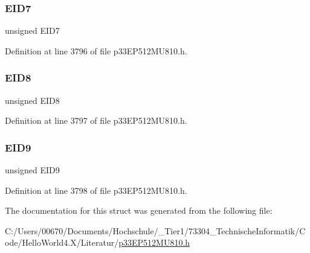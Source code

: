 \subsubsection{\texorpdfstring{E\+I\+D7}{EID7}}
{\footnotesize\ttfamily unsigned E\+I\+D7}



Definition at line 3796 of file p33\+E\+P512\+M\+U810.\+h.

\mbox{\label{structtag_c1_r_x_f1_e_i_d_b_i_t_s_acca25e0b7d86eb499d01f85222baea87}} 
\subsubsection{\texorpdfstring{E\+I\+D8}{EID8}}
{\footnotesize\ttfamily unsigned E\+I\+D8}



Definition at line 3797 of file p33\+E\+P512\+M\+U810.\+h.

\mbox{\label{structtag_c1_r_x_f1_e_i_d_b_i_t_s_ac6748f73d4ada8538b06548be4f396c2}} 
\subsubsection{\texorpdfstring{E\+I\+D9}{EID9}}
{\footnotesize\ttfamily unsigned E\+I\+D9}



Definition at line 3798 of file p33\+E\+P512\+M\+U810.\+h.



The documentation for this struct was generated from the following file\+:\begin{DoxyCompactItemize}
\item 
C\+:/\+Users/00670/\+Documents/\+Hochschule/\+\_\+\+Tier1/73304\+\_\+\+Technische\+Informatik/\+Code/\+Hello\+World4.\+X/\+Literatur/\hyperlink{p33_e_p512_m_u810_8h}{p33\+E\+P512\+M\+U810.\+h}\end{DoxyCompactItemize}
